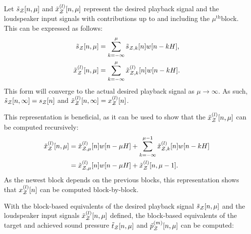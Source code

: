 Let $\tilde{s}_{\mathcal{Z}}[n, \mu]$ and $\tilde{x}^{(l)}_{\mathcal{Z}}[n, \mu]$ represent the desired playback signal and the loudspeaker input signals with contributions up to and including the $\mu^\mathrm{th}$block. 
This can be expressed as follows:
\begin{align}
    \tilde{s}_{\mathcal{Z}}[n, \mu] &= \sum_{k=-\infty}^{\mu} \tilde{s}_{\mathcal{Z},k}[n]w[n - kH], \\
    \tilde{x}^{(l)}_{\mathcal{Z}}[n, \mu] &= \sum_{k=-\infty}^{\mu} \tilde{x}^{(l)}_{\mathcal{Z},k}[n]w[n - kH].
\end{align}
This form will converge to the actual desired playback signal as $\mu\to\infty$.
As such, $\tilde{s}_{\mathcal{Z}}[n, \infty] = s_{\mathcal{Z}}[n]$ and $\tilde{x}^{(l)}_{\mathcal{Z}}[n, \infty] = x^{(l)}_{\mathcal{Z}}[n]$.

This representation is beneficial, as it can be used to show that the $\tilde{x}^{(l)}_{\mathcal{Z}}[n, \mu]$ can be computed recursively:
\begin{align}
    \begin{aligned}
    \tilde{x}^{(l)}_{\mathcal{Z}}[n, \mu] &= \tilde{x}^{(l)}_{\mathcal{Z},\mu}[n]w[n - \mu H] +
                               \sum_{k=-\infty}^{\mu - 1} \tilde{x}^{(l)}_{\mathcal{Z},k}[n]w[n - kH] \\
                           &=  \tilde{x}^{(l)}_{\mathcal{Z},\mu}[n]w[n - \mu H] + \tilde{x}^{(l)}_{\mathcal{Z}}[n, \mu - 1].
    \end{aligned}
\end{align}
As the newest block depends on the previous blocks, this representation shows that $x^{(l)}_{\mathcal{Z}}[n]$ can be computed block-by-block.

With the block-based equivalents of the desired playback signal $\tilde{s}_{\mathcal{Z}}[n, \mu]$ and the loudspeaker input signals $\tilde{x}^{(l)}_{\mathcal{Z}}[n, \mu]$ defined, the block-based equivalents of the target and achieved sound pressure $\tilde{t}_{\mathcal{Z}}[n, \mu]$ and $\tilde{p}^{(m)}_{\mathcal{Z}}[n, \mu]$ can be computed: 

